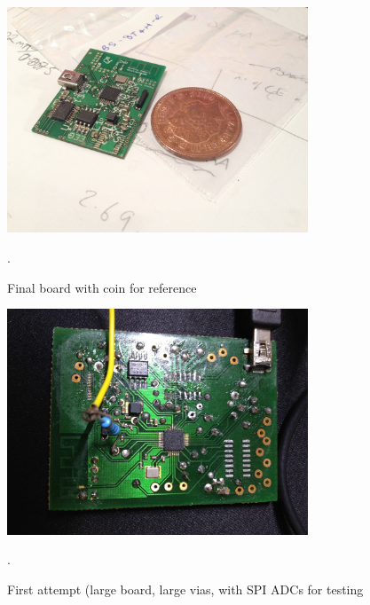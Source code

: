 \documentclass[]{article}
\begin{document}
\begin{figure}[H]
	\begin{center}
		\includegraphics[width = 0.8\textwidth]{coin.jpg}
	\end{center}
	\caption{Final board with coin for reference}. 
	\label{fig:coin}
\end{figure}

\begin{figure}[H]
	\begin{center}
		\includegraphics[width = 0.8\textwidth]{first}
	\end{center}
	\caption{First attempt (large board, large vias, with SPI \ac{ADC}s for testing}. 
	\label{fig:first}
\end{figure}
\end{document}
